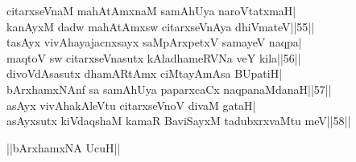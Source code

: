 \documentclass{article}
\begin{document}
citarxseVnaM mahAtAmxnaM samAhUya naroVtatxmaH|\\
kanAyxM dadw mahAtAmxsw citarxseVnAya dhiVmateV||55||\\
tasAyx vivAhayajacnxsayx saMpArxpetxV samayeV naqpa|\\
maqtoV sw citarxseVnasutx kAladhameRVNa veY kila||56||\\
divoVdAsasutx dhamARtAmx ciMtayAmAsa BUpatiH|\\
bArxhamxNAnf sa samAhUya paparxcaCx naqpanaMdanaH||57||\\
asAyx vivAhakAleVtu citarxseVnoV  divaM gataH|\\
asAyxsutx kiVdaqshaM kamaR BaviSayxM tadubxrxvaMtu meV||58||\\

\begin{center}
||bArxhamxNA UcuH||
\end{center}
\end{document}
